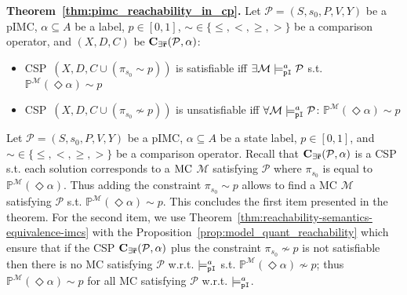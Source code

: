 \documentclass{llncs}
\newcommand{\mc}{\textnormal{MC}}
\newcommand{\pimc}{\textnormal{pIMC}}
\newcommand{\csp}{\textnormal{CSP}}
\newcommand{\satisfactionPimc}{\ensuremath{\models^a_{\tt{pI}}}}
\newcommand{\MerExt}{\ensuremath{{\bf C_{{\exists}\bar{r}}}}}
\newcommand{\Proba}            {\ensuremath{\mathbb{P}}}
\newcommand{\ltlExists}{\ensuremath{\Diamond}}
\begin{document}
\begin{paragraph}{\textnormal{\textbf{Theorem~\ref{thm:pimc_reachability_in_cp}.}}}
	Let $\mathcal{P} = (S, s_0 , P, V, Y)$ be a \pimc,
	$\alpha \subseteq A$ be a label,
	$p \in [0, 1]$,
    ${\sim} \in \{\leq,<, \geq,>\}$ be a comparison operator,
    and $(X,D,C)$ be $\MerExt(\mathcal{P}, \alpha)$:
    \vspace*{-0.05cm}
    \begin{itemize}
    	\item 
			\csp\ $(X,D,C \cup (\pi_{s_0} \sim p))$
    		is satisfiable iff 
    		$\exists \mathcal{M} \satisfactionPimc \mathcal{P}$ s.t. $\Proba^\mathcal{M}(\ltlExists \alpha) \sim p$
   		\item
			\csp\ $(X,D,C \cup (\pi_{s_0} \not\sim p))$
    		is unsatisfiable iff 
    		$\forall \mathcal{M} \satisfactionPimc \mathcal{P}$: $\Proba^\mathcal{M}(\ltlExists \alpha) \sim p$
	\end{itemize}
\end{paragraph}

Let  $\mathcal{P} = (S, s_0 , P, V, Y)$ be a {\pimc},
$\alpha \subseteq A$ be a state label,
$p \in [0, 1]$, and
${\sim} \in \{\leq,<, \geq,>\}$ be a comparison operator.
Recall that $\MerExt(\mathcal{P},\alpha)$ is a {\csp} s.t.
each solution corresponds to a $\mc$ $\mathcal{M}$ satisfying $\mathcal{P}$ where $\pi_{s_0}$ is equal to $\Proba^\mathcal{M}(\ltlExists \alpha)$.
Thus adding the constraint $\pi_{s_0} \sim p$ allows to find a {\mc}
$\mathcal{M}$ satisfying $\mathcal{P}$ s.t. $\Proba^\mathcal{M}(\ltlExists \alpha) \sim p$.
This concludes the first item presented in the theorem.
For the second item, we use Theorem~\ref{thm:reachability-semantics-equivalence-imcs} with the Proposition~\ref{prop:model_quant_reachability} which ensure that if the {\csp} $\MerExt(\mathcal{P},\alpha)$ plus the constraint $\pi_{s_0} \not\sim p$ is not satisfiable then 
there is no {\mc} satisfying $\mathcal{P}$ w.r.t. $\satisfactionPimc$ s.t. $\Proba^\mathcal{M}(\ltlExists \alpha) \not\sim p$;
thus $\Proba^\mathcal{M}(\ltlExists \alpha) \sim p$ 
for all {\mc} satisfying $\mathcal{P}$ w.r.t. $\satisfactionPimc$.
\end{document}

